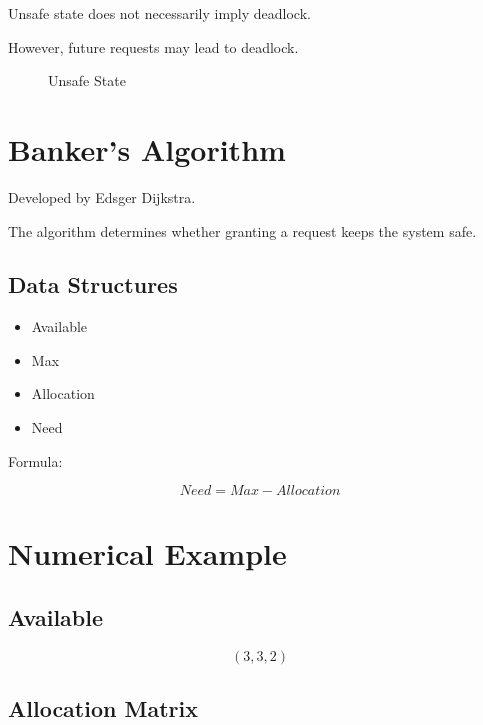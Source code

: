 Unsafe state does not necessarily imply deadlock.

However, future requests may lead to deadlock.

\begin{figure}[H]
\centering
{}
\caption{Unsafe State}
\end{figure}

\section{Banker's Algorithm}

Developed by Edsger Dijkstra.

The algorithm determines whether granting a request keeps the system safe.

\subsection{Data Structures}

\begin{itemize}
\item Available
\item Max
\item Allocation
\item Need
\end{itemize}

Formula:

\[
Need = Max - Allocation
\]

\section{Numerical Example}

\subsection{Available}

\[
(3,3,2)
\]

\subsection{Allocation Matrix}

